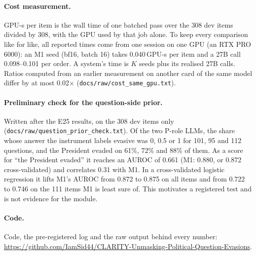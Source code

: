 \paragraph{Cost measurement.}
GPU-s per item is the wall time of one batched pass over the 308 dev items divided by 308, with the GPU used by that job alone.
To keep every comparison like for like, all reported times come from one session on one GPU (an RTX PRO 6000): an M1 seed (bf16, batch 16) takes 0.040\,GPU-s per item and a 27B call 0.098--0.101 per order.
A system's time is $K$ seeds plus its realised 27B calls. Ratios computed from an earlier measurement on another card of the same model differ by at most 0.02$\times$ (\texttt{docs/raw/cost\_same\_gpu.txt}).

\paragraph{Preliminary check for the question-side prior.}
Written after the E25 results, on the 308 dev items only (\texttt{docs/raw/question\_prior\_check.txt}). Of the two P-role LLMs, the share whose answer the instrument labels evasive was 0, 0.5 or 1 for 101, 95 and 112 questions, and the President evaded on 61\%, 72\% and 88\% of them. As a score for ``the President evaded'' it reaches an AUROC of 0.661 (M1: 0.880, or 0.872 cross-validated) and correlates 0.31 with M1. In a cross-validated logistic regression it lifts M1's AUROC from 0.872 to 0.875 on all items and from 0.722 to 0.746 on the 111 items M1 is least sure of. This motivates a registered test and is not evidence for the module.

\paragraph{Code.}
Code, the pre-registered log and the raw output behind every number: \url{https://github.com/IamSid44/CLARITY-Unmasking-Political-Question-Evasions}.

\FigureSwap
